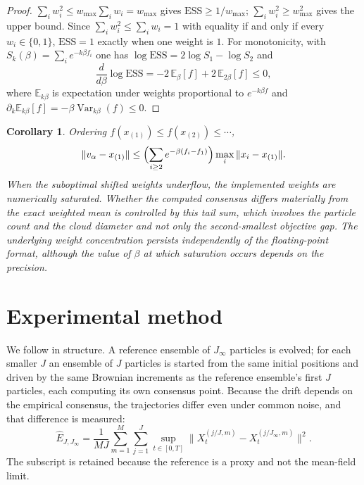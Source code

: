\documentclass[pdflatex,sn-mathphys-num]{sn-jnl}
\theoremstyle{thmstyleone}
\newtheorem{corollary}[theorem]{Corollary}
\theoremstyle{thmstyletwo}
\theoremstyle{thmstylethree}
\begin{document}
\begin{proof}
$\sum_iw_i^2\le w_{\max}\sum_iw_i=w_{\max}$ gives $\mathrm{ESS}\ge1/w_{\max}$; $\sum_iw_i^2\ge w_{\max}^2$ gives the upper bound. Since $\sum_iw_i^2\le\sum_iw_i=1$ with equality if and only if every $w_i\in\{0,1\}$, $\mathrm{ESS}=1$ exactly when one weight is $1$. For monotonicity, with $S_k(\beta)=\sum_ie^{-k\beta f_i}$ one has $\log\mathrm{ESS}=2\log S_1-\log S_2$ and
\[
\frac{d}{d\beta}\log\mathrm{ESS}=-2\,\mathbb E_\beta[f]+2\,\mathbb E_{2\beta}[f]\le0,
\]
where $\mathbb E_{k\beta}$ is expectation under weights proportional to $e^{-k\beta f}$ and $\partial_k\mathbb E_{k\beta}[f]=-\beta\operatorname{Var}_{k\beta}(f)\le0$.
\end{proof}

\begin{corollary}\label{cor:notartifact}
Ordering $f(x_{(1)})\le f(x_{(2)})\le\cdots$,
\[
\|v_\alpha-x_{(1)}\|\le\Bigl(\sum_{i\ge2}e^{-\beta(f_i-f_1)}\Bigr)\max_i\|x_i-x_{(1)}\|.
\]
When the suboptimal shifted weights underflow, the implemented weights are numerically saturated. Whether the computed consensus differs materially from the exact weighted mean is controlled by this tail sum, which involves the particle count and the cloud diameter and not only the second-smallest objective gap. The underlying weight concentration persists independently of the floating-point format, although the value of $\beta$ at which saturation occurs depends on the precision.
\end{corollary}

\section{Experimental method}\label{sec6}

We follow \cite[Subsection 2.6]{ghv2025} in structure. A reference ensemble of $J_\infty$ particles is evolved; for each smaller $J$ an ensemble of $J$ particles is started from the same initial positions and driven by the same Brownian increments as the reference ensemble's first $J$ particles, each computing its own consensus point. Because the drift depends on the empirical consensus, the trajectories differ even under common noise, and that difference is measured:
\begin{equation}\label{eq:est}
\hat E_{J,J_\infty}=\frac1{MJ}\sum_{m=1}^M\sum_{j=1}^J\sup_{t\in[0,T]}\bigl\|X^{(j/J,m)}_t-X^{(j/J_\infty,m)}_t\bigr\|^2 .
\end{equation}
The subscript is retained because the reference is a proxy and not the mean-field limit.
\end{document}
